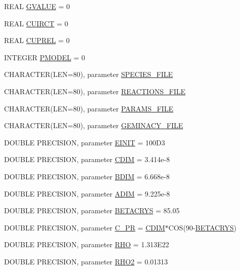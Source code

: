 \begin{DoxyCompactItemize}
\item 
REAL \hyperlink{namespaceparameters_a3c39b69e0083dc018e4546bd5a02b301}{GVALUE} = 0
\item 
REAL \hyperlink{namespaceparameters_a2855e0778fdd644c62b1a6943a4c363a}{CUIRCT} = 0
\item 
REAL \hyperlink{namespaceparameters_a170cb61fd1eef5175a5eaf95d0d85ab5}{CUPREL} = 0
\item 
INTEGER \hyperlink{namespaceparameters_a38fbcf3f41331f232ff4c604194bc76f}{PMODEL} = 0
\item 
CHARACTER(LEN=80), parameter \hyperlink{namespaceparameters_af23a39fc248303c9a69e3e05c0fb3b41}{SPECIES\_\-FILE}
\item 
CHARACTER(LEN=80), parameter \hyperlink{namespaceparameters_a40ef599fa2e91d0f27cbd322f1270da8}{REACTIONS\_\-FILE}
\item 
CHARACTER(LEN=80), parameter \hyperlink{namespaceparameters_adf79c33c6ebf2e4f00fa0fdaf34d1ba1}{PARAMS\_\-FILE}
\item 
CHARACTER(LEN=80), parameter \hyperlink{namespaceparameters_a045269697aa491915bf603f55e12b63a}{GEMINACY\_\-FILE}
\item 
DOUBLE PRECISION, parameter \hyperlink{namespaceparameters_a5f4fb781d85daf37e0a18e15e4dcc9c8}{EINIT} = 100D3
\item 
DOUBLE PRECISION, parameter \hyperlink{namespaceparameters_a1f6362692e1384b097b58b185096b416}{CDIM} = 3.414e-\/8
\item 
DOUBLE PRECISION, parameter \hyperlink{namespaceparameters_a3a667857cb5e332f397b7ff0e96dbb85}{BDIM} = 6.668e-\/8
\item 
DOUBLE PRECISION, parameter \hyperlink{namespaceparameters_ad2ed15127be0caca99788b8acc6e605b}{ADIM} = 9.225e-\/8
\item 
DOUBLE PRECISION, parameter \hyperlink{namespaceparameters_aaa3c163a9f90b6d0c5a314ca449da18b}{BETACRYS} = 85.05
\item 
DOUBLE PRECISION, parameter \hyperlink{namespaceparameters_a998d2db873404e0cfe943d50d3877262}{C\_\-PR} = \hyperlink{namespaceparameters_a1f6362692e1384b097b58b185096b416}{CDIM}$\ast$COS(90-\/\hyperlink{namespaceparameters_aaa3c163a9f90b6d0c5a314ca449da18b}{BETACRYS})
\item 
DOUBLE PRECISION, parameter \hyperlink{namespaceparameters_ad8323286536365bb131984aa57af99df}{RHO} = 1.313E22
\item 
DOUBLE PRECISION, parameter \hyperlink{namespaceparameters_a79fa48b917f68e1a12577e33fd8c991c}{RHO2} = 0.01313
\item 

\end{DoxyCompactItemize}
